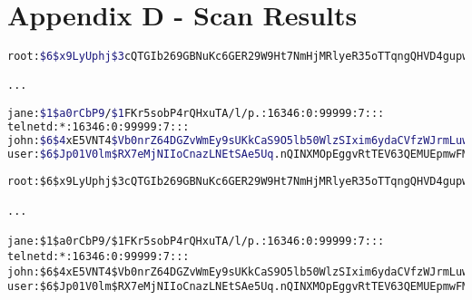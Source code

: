 \section{Appendix D - Scan Results}



\lstset{extendedchars=\true}
\lstset{inputencoding=ansinew}

\begin{lstlisting}[language=bash]
root:$6$x9LyUphj$3cQTGIb269GBNuKc6GER29W9Ht7NmHjMRlyeR35oTTqngQHVD4gupwzSmjhAYOc6KEyfGQ32De27SgOCNzKcE.:16371:0:99999:7:::

...

jane:$1$a0rCbP9/$1FKr5sobP4rQHxuTA/l/p.:16346:0:99999:7:::
telnetd:*:16346:0:99999:7:::
john:$6$4xE5VNT4$Vb0nrZ64DGZvWmEy9sUKkCaS9O5lb50WlzSIxim6ydaCVfzWJrmLuwZIPxjgw1ZDIeQB9C9jX7qb7AtiDibjo0:16346:0:99999:7:::
user:$6$Jp01V0lm$RX7eMjNIIoCnazLNEtSAe5Uq.nQINXMOpEggvRtTEV63QEMUEpmwFMJhYzQtLT/M33Kbl5Mhr59tPJbvN/u4k1:16346:0:99999:7:::
\end{lstlisting}

\begin{lstlisting}
root:$6$x9LyUphj$3cQTGIb269GBNuKc6GER29W9Ht7NmHjMRlyeR35oTTqngQHVD4gupwzSmjhAYOc6KEyfGQ32De27SgOCNzKcE.:16371:0:99999:7:::

...

jane:$1$a0rCbP9/$1FKr5sobP4rQHxuTA/l/p.:16346:0:99999:7:::
telnetd:*:16346:0:99999:7:::
john:$6$4xE5VNT4$Vb0nrZ64DGZvWmEy9sUKkCaS9O5lb50WlzSIxim6ydaCVfzWJrmLuwZIPxjgw1ZDIeQB9C9jX7qb7AtiDibjo0:16346:0:99999:7:::
user:$6$Jp01V0lm$RX7eMjNIIoCnazLNEtSAe5Uq.nQINXMOpEggvRtTEV63QEMUEpmwFMJhYzQtLT/M33Kbl5Mhr59tPJbvN/u4k1:16346:0:99999:7:::
\end{lstlisting}